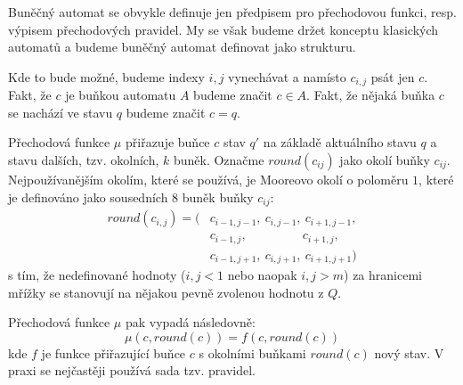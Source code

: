 \documentclass[a4paper,10pt]{article}
\begin{document}
\begin{note}
  Buněčný automat se obvykle definuje jen předpisem pro přechodovou funkci, resp. výpisem přechodových pravidel. My se však budeme držet konceptu klasických automatů a budeme buněčný automat definovat jako strukturu.
\end{note}
\begin{notation*}
  Kde to bude možné, budeme indexy $i,j$ vynechávat a namísto $c_{i,j}$ psát jen $c$. Fakt, že $c$ je buňkou automatu $A$ budeme značit $c \in A$. Fakt, že nějaká buňka $c$ se nachází ve stavu $q$ budeme značit $c = q$. 
\end{notation*}

Přechodová funkce $\mu$ přiřazuje buňce $c$ stav $q'$ na základě aktuálního stavu $q$ a stavu dalších, tzv. okolních, $k$ buněk. Označme $round(c_{ij})$ jako okolí buňky $c_{ij}$. Nejpoužívanějším okolím, které se používá, je Mooreovo okolí o poloměru $1$, které je definováno jako sousedních $8$ buněk buňky $c_{ij}$:
\begin{align*}
 round(c_{i,j}) = (
  & c_{i-1, j-1},\ 	c_{i, j-1},\ 	c_{i+1, j-1},	\\
  & c_{i-1, j  },\ 	\qquad \qquad\ 	c_{i+1, j  },	\\
  & c_{i-1, j+1},\ 	c_{i, j+1},\ 	c_{i+1, j+1}	
 )
\end{align*}
s tím, že nedefinované hodnoty ($i,j < 1$ nebo naopak $i,j > m$) za hranicemi mřížky se stanovují na nějakou pevně zvolenou hodnotu z $Q$.

Přechodová funkce $\mu$ pak vypadá následovně:
$$
\mu(c, round(c)) = f(c, round(c))
$$
kde $f$ je funkce přiřazující buňce $c$ s okolními buňkami $round(c)$ nový stav. V praxi se nejčastěji používá sada tzv. \ifthen pravidel.
\end{document}
